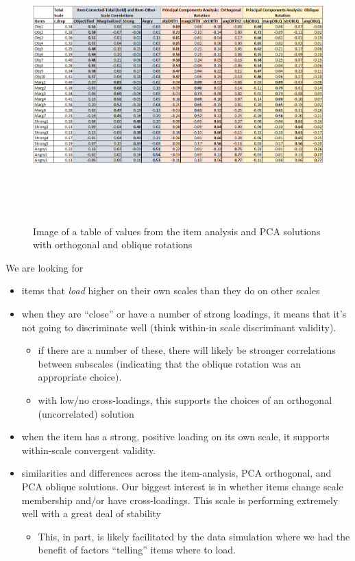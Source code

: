 \documentclass[
  english,
]{book}
\providecommand{\tightlist}{%
  \setlength{\itemsep}{0pt}\setlength{\parskip}{0pt}}
\begin{document}
\begin{figure}
\hypertarget{id}{%
\centering
\includegraphics[width=6.25in,height=4.16667in]{images/PCA/ComparisonsTable.png}
\caption{Image of a table of values from the item analysis and PCA solutions with orthogonal and oblique rotations}\label{id}
}
\end{figure}

We are looking for

\begin{itemize}
\tightlist
\item
  items that \emph{load} higher on their own scales than they do on other scales
\item
  when they are ``close'' or have a number of strong loadings, it means that it's not going to discriminate well (think within-in scale discriminant validity).

  \begin{itemize}
  \tightlist
  \item
    if there are a number of these, there will likely be stronger correlations between subscales (indicating that the oblique rotation was an appropriate choice).
  \item
    with low/no cross-loadings, this supports the choices of an orthogonal (uncorrelated) solution
  \end{itemize}
\item
  when the item has a strong, positive loading on its own scale, it supports within-scale convergent validity.
\item
  similarities and differences across the item-analysis, PCA orthogonal, and PCA oblique solutions. Our biggest interest is in whether items change scale membership and/or have cross-loadings. This scale is performing extremely well with a great deal of stability

  \begin{itemize}
  \tightlist
  \item
    This, in part, is likely facilitated by the data simulation where we had the benefit of factors ``telling'' items where to load.
  \end{itemize}
\end{itemize}
\end{document}
